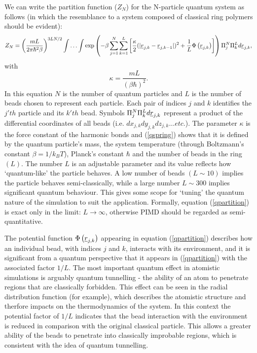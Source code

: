 We can write the partition function ($Z_{N}$) for the N-particle
quantum system as follows (in which the resemblance to a system
composed of classical ring polymers should be evident):
\begin{equation}
  Z_{N}= \left ( \frac{mL}{2 \pi \hbar^{2} \beta} \right )^{3LN/2} \int \ldots \int \exp \left ( -\beta \sum_{j=1}^{N} 
\sum_{k=1}^{L} \left [ \frac{\kappa}{2}(|\mbox{$\underline{ r}$}_{j,k}-\mbox{$\underline{ r}$}_{j,k-1}| )^{2}+ 
 \frac{1}{L} \Phi\left(\mbox{$\underline{ r}$}_{j,k}\right) \right ] \right ) \Pi_{j}^{N} \Pi_{k}^{L} d \mbox{$\underline{ r}$}_{j,k}, \label{qpartition}
\end{equation}
with
\begin{equation}
  \kappa = \frac{mL}{(\beta \hbar)^{2}}. \label{qspring}
\end{equation}
In this equation $N$ is the number of quantum particles and $L$ is the
number of beads chosen to represent each particle. Each pair of
indices $j$ and $k$ identifies the $j'th$ particle and its $k'th$
bead. Symbols $\Pi_{j}^{N} \Pi_{k}^{L} d \mbox{$\underline{r}$}_{j,k}$ represent a
product of the differential coordinates of all beads
(i.e. $dx_{j,k}dy_{j,k}dz_{j,k} \ldots etc.$).  The parameter $\kappa$
is the force constant of the harmonic bonds and (\ref{qspring}) shows
that it is defined by the quantum particle's mass, the system
temperature (through Boltzmann's constant $\beta=1/k_{B}T$), Planck's
constant $\hbar$ and the number of beads in the ring $(L)$. The number
$L$ is an adjustable parameter and its value reflects how
`quantum-like' the particle behaves. A low number of beads $(L\sim
10)$ implies the particle behaves semi-classically, while a large
number $L\sim 300$ implies significant quantum behaviour. This gives
some scope for `tuning' the quantum nature of the simulation to suit
the application. Formally, equation (\ref{qpartition}) is exact only
in the limit: $L \rightarrow \infty$, otherwise PIMD should be
regarded as semi-quantitative.

The potential function $\Phi\left (\mbox{$\underline{r}$}_{j,k}\right)$ appearing in
equation (\ref{qpartition}) describes how an individual bead, with
indices $j$ and $k$, interacts with its environment, and it is
significant from a quantum perspective that it appears in
(\ref{qpartition}) with the associated factor $1/L$.  The most
important quantum effect in atomistic simulations is arguably quantum
tunnelling - the ability of an atom to penetrate regions that are
classically forbidden. This effect can be seen in the radial
distribution function (for example), which describes the atomistic
structure and therfore impacts on the thermodynamics of the system. In
this context the potential factor of $1/L$ indicates that the bead
interaction with the environment is reduced in comparison with the
original classical particle. This allows a greater ability of the beads
to penetrate into classically improbable regions, which is consistent
with the idea of quantum tunnelling.

